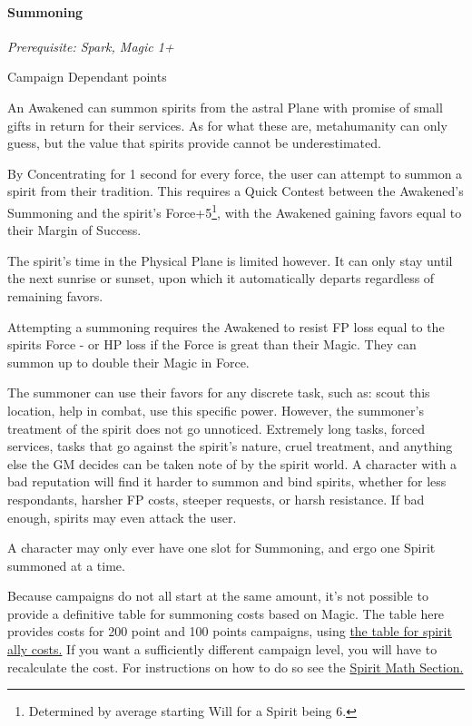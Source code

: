 \begin{multicols*}{3}
	\paragraph{Summoning}\label{summoning}
	\textit{Prerequisite: Spark, Magic 1+}
	\begin{flushright}
		Campaign Dependant points
	\end{flushright}
	
	An Awakened can summon spirits from the astral Plane with promise of small gifts in return for their services. As for what these are, metahumanity can only guess, but the value that spirits provide cannot be underestimated.
	
	By Concentrating for 1 second for every force, the user can attempt to summon a spirit from their tradition. This requires a Quick Contest between the Awakened's Summoning and the spirit's Force+5\footnote{Determined by average starting Will for a Spirit being 6.}, with the Awakened gaining favors equal to their Margin of Success. 
	
	The spirit's time in the Physical Plane is limited however. It can only stay until the next sunrise or sunset, upon which it automatically departs regardless of remaining favors.
	
	Attempting a summoning requires the Awakened to resist FP loss equal to the spirits Force - or HP loss if the Force is great than their Magic. They can summon up to double their Magic in Force.
	
	The summoner can use their favors for any discrete task, such as: scout this location, help in combat, use this specific power. However, the summoner's treatment of the spirit does not go unnoticed. Extremely long tasks, forced services, tasks that go against the spirit's nature, cruel treatment, and anything else the GM decides can be taken note of by the spirit world. A character with a bad reputation will find it harder to summon and bind spirits, whether for less respondants, harsher FP costs, steeper requests, or harsh resistance. If bad enough, spirits may even attack the user.
	
	A character may only ever have one slot for Summoning, and ergo one Spirit summoned at a time.
	
	Because campaigns do not all start at the same amount, it's not possible to provide a definitive table for summoning costs based on Magic. The table here provides costs for 200 point and 100 points campaigns, using \hyperref[spirit_ally_cost]{the table for spirit ally costs.} If you want a sufficiently different campaign level, you will have to recalculate the cost. For instructions on how to do so see the \hyperref[spirit_math]{Spirit Math Section.} 
	

\end{multicols*}
